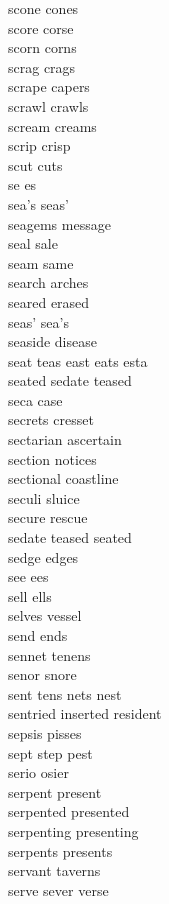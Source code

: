 scone cones\\
score corse\\
scorn corns\\
scrag crags\\
scrape capers\\
scrawl crawls\\
scream creams\\
scrip crisp\\
scut cuts\\
se es\\
sea's seas'\\
seagems message\\
seal sale\\
seam same\\
search arches\\
seared erased\\
seas' sea's\\
seaside disease\\
seat teas east eats esta\\
seated sedate teased\\
seca case\\
secrets cresset\\
sectarian ascertain\\
section notices\\
sectional coastline\\
seculi sluice\\
secure rescue\\
sedate teased seated\\
sedge edges\\
see ees\\
sell ells\\
selves vessel\\
send ends\\
sennet tenens\\
senor snore\\
sent tens nets nest\\
sentried inserted resident\\
sepsis pisses\\
sept step pest\\
serio osier\\
serpent present\\
serpented presented\\
serpenting presenting\\
serpents presents\\
servant taverns\\
serve sever verse\\
